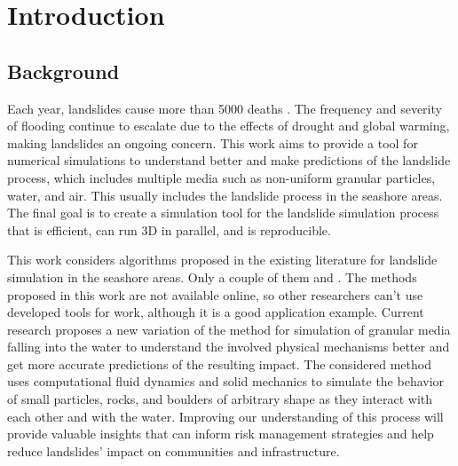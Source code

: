 \chapter{Introduction} \label{chap:intro}

\section{Background}

Each year, landslides cause more than 5000 deaths \cite{perkins2012death}. The frequency and severity of flooding continue to escalate due to the effects of drought and global warming, making landslides an ongoing concern. This work aims to provide a tool for numerical simulations to understand better and make predictions of the landslide process, which includes multiple media such as non-uniform granular particles, water, and air. This usually includes the landslide process in the seashore areas. The final goal is to create a simulation tool for the landslide simulation process that is efficient, can run 3D in parallel, and is reproducible. 

This work considers algorithms proposed in the existing literature for landslide simulation in the seashore areas. Only a couple of them \cite{nan2023high} and \cite{shen2022resolved}. The methods proposed in this work are not available online, so other researchers can't use developed tools for work, although it is a good application example. Current research proposes a new variation of the method for simulation of granular media falling into the water to understand the involved physical mechanisms better and get more accurate predictions of the resulting impact. The considered method uses computational fluid dynamics and solid mechanics to simulate the behavior of small particles, rocks, and boulders of arbitrary shape as they interact with each other and with the water. Improving our understanding of this process will provide valuable insights that can inform risk management strategies and help reduce landslides' impact on communities and infrastructure.

